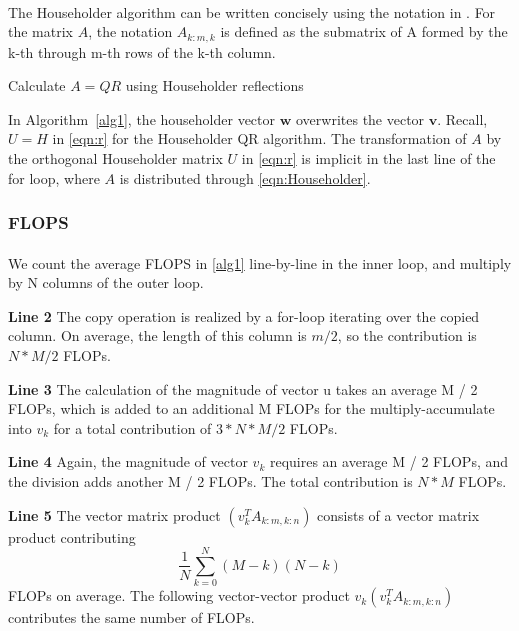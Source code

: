 \documentclass{article}
\begin{document}
\paragraph{}
The Householder algorithm can be written concisely using the notation in \cite{}. For the matrix $A$, the notation $A_{k:m,k}$ is defined as the submatrix of A formed by the k-th through m-th rows of the k-th column. 


\begin{algorithm}
\caption{Calculate $A = QR$ using Householder reflections}
\label{alg1}
\begin{algorithmic}[1]
\ENDFOR
\end{algorithmic}
\end{algorithm}
In Algorithm~\ref{alg1}, the householder vector $\mathbf{w}$ overwrites the vector $\mathbf{v}$. Recall, $U=H$ in \eqref{eqn:r} for the Householder QR algorithm. The transformation of $A$ by the orthogonal Householder matrix $U$ in \eqref{eqn:r} is implicit in the last line of the for loop, where $A$ is distributed through \eqref{eqn:Householder}.

\subsubsection{FLOPS}
\paragraph{}
We count the average FLOPS in \ref{alg1} line-by-line in the inner loop, and multiply by N columns of the outer loop.

\textbf{Line 2}
The copy operation is realized by a for-loop iterating over the copied column. On average, the length of this column is $m/2$, so the contribution is $N * M / 2$ FLOPs.

\textbf{Line 3}
The calculation of the magnitude of vector u takes an average M / 2 FLOPs, which is added to an additional M FLOPs for the multiply-accumulate into $v_k$ for a total contribution of $3 * N * M / 2$ FLOPs.

\textbf{Line 4}
Again, the magnitude of vector $v_k$ requires an average M / 2 FLOPs, and the division adds another M / 2 FLOPs. The total contribution is $N * M$ FLOPs.

\textbf{Line 5}
The vector matrix product $(v_{k}^{T}A_{k:m,k:n})$ consists of a vector matrix product contributing $$\frac{1}{N} \sum_{k=0}^N (M-k)(N-k)$$ FLOPs on average. The following vector-vector product $v_{k}(v_{k}^{T}A_{k:m,k:n})$ contributes the same number of FLOPs.
\end{document}
